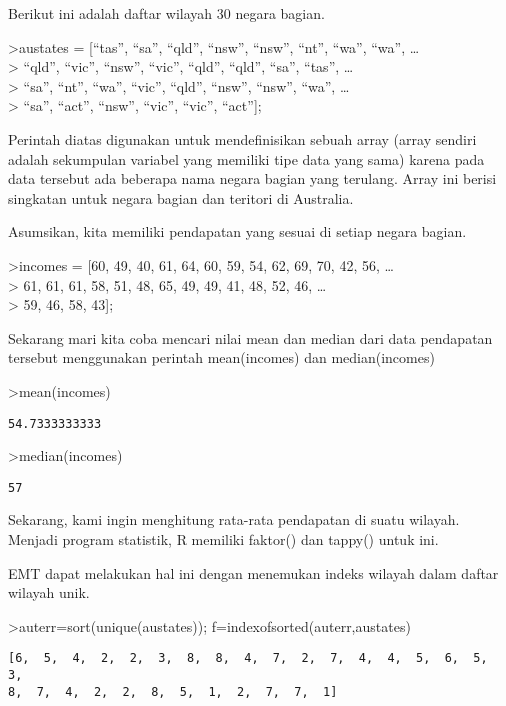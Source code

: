 \documentclass[
]{book}
\begin{document}
Berikut ini adalah daftar wilayah 30 negara bagian.

\textgreater austates = {[}``tas'', ``sa'', ``qld'', ``nsw'', ``nsw'', ``nt'', ``wa'', ``wa'', \ldots{}\\
\textgreater{} ``qld'', ``vic'', ``nsw'', ``vic'', ``qld'', ``qld'', ``sa'', ``tas'', \ldots{}\\
\textgreater{} ``sa'', ``nt'', ``wa'', ``vic'', ``qld'', ``nsw'', ``nsw'', ``wa'', \ldots{}\\
\textgreater{} ``sa'', ``act'', ``nsw'', ``vic'', ``vic'', ``act''{]};

Perintah diatas digunakan untuk mendefinisikan sebuah array (array sendiri adalah sekumpulan variabel yang memiliki tipe data yang sama) karena pada data tersebut ada beberapa nama negara bagian yang terulang. Array ini berisi singkatan untuk negara bagian dan teritori di Australia.

Asumsikan, kita memiliki pendapatan yang sesuai di setiap negara bagian.

\textgreater incomes = {[}60, 49, 40, 61, 64, 60, 59, 54, 62, 69, 70, 42, 56, \ldots{}\\
\textgreater{} 61, 61, 61, 58, 51, 48, 65, 49, 49, 41, 48, 52, 46, \ldots{}\\
\textgreater{} 59, 46, 58, 43{]};

Sekarang mari kita coba mencari nilai mean dan median dari data pendapatan tersebut menggunakan perintah mean(incomes) dan median(incomes)

\textgreater mean(incomes)

\begin{verbatim}
54.7333333333
\end{verbatim}

\textgreater median(incomes)

\begin{verbatim}
57
\end{verbatim}

Sekarang, kami ingin menghitung rata-rata pendapatan di suatu wilayah. Menjadi program statistik, R memiliki faktor() dan tappy() untuk ini.

EMT dapat melakukan hal ini dengan menemukan indeks wilayah dalam daftar wilayah unik.

\textgreater auterr=sort(unique(austates)); f=indexofsorted(auterr,austates)

\begin{verbatim}
[6,  5,  4,  2,  2,  3,  8,  8,  4,  7,  2,  7,  4,  4,  5,  6,  5,  3,
8,  7,  4,  2,  2,  8,  5,  1,  2,  7,  7,  1]
\end{verbatim}
\end{document}
